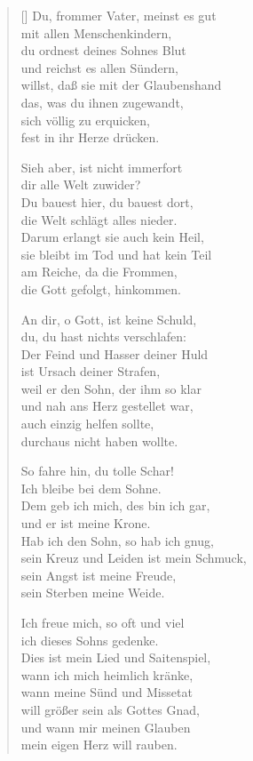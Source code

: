\begin{multicols}{2}
\begin{verse}[\versewidth]
 Du, frommer Vater, meinst es gut\\
mit allen Menschenkindern,\\
du ordnest deines Sohnes Blut\\
und reichst es allen Sündern,\\
willst, daß sie mit der Glaubenshand\\
das, was du ihnen zugewandt,\\
sich völlig zu erquicken,\\
fest in ihr Herze drücken.

 Sieh aber, ist nicht immerfort\\
dir alle Welt zuwider?\\
Du bauest hier, du bauest dort,\\
die Welt schlägt alles nieder.\\
Darum erlangt sie auch kein Heil,\\
sie bleibt im Tod und hat kein Teil\\
am Reiche, da die Frommen,\\
die Gott gefolgt, hinkommen.

 An dir, o Gott, ist keine Schuld,\\
du, du hast nichts verschlafen:\\
Der Feind und Hasser deiner Huld\\
ist Ursach deiner Strafen,\\
weil er den Sohn, der ihm so klar\\
und nah ans Herz gestellet war,\\
auch einzig helfen sollte,\\
durchaus nicht haben wollte.

 So fahre hin, du tolle Schar!\\
Ich bleibe bei dem Sohne.\\
Dem geb ich mich, des bin ich gar,\\
und er ist meine Krone.\\
Hab ich den Sohn, so hab ich gnug,\\
sein Kreuz und Leiden ist mein Schmuck,\\
sein Angst ist meine Freude,\\
sein Sterben meine Weide.

 Ich freue mich, so oft und viel\\
ich dieses Sohns gedenke.\\
Dies ist mein Lied und Saitenspiel,\\
wann ich mich heimlich kränke,\\
wann meine Sünd und Missetat\\
will größer sein als Gottes Gnad,\\
und wann mir meinen Glauben\\
mein eigen Herz will rauben.


\end{verse}
\end{multicols}
